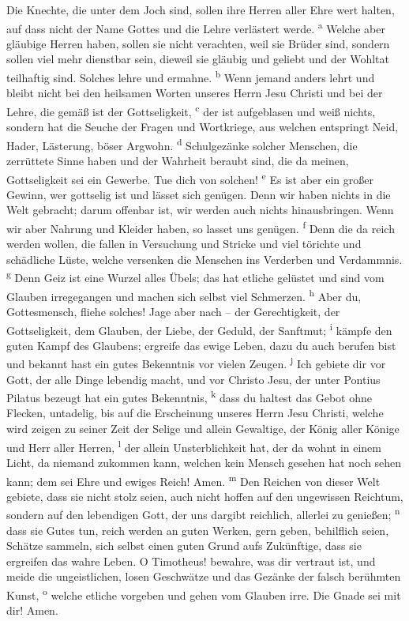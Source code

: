  Die Knechte, die unter dem Joch sind, sollen ihre Herren
aller Ehre wert halten, auf dass nicht der Name Gottes und die Lehre
verlästert werde. \textsuperscript{a}  Welche aber
gläubige Herren haben, sollen sie nicht verachten, weil sie Brüder sind,
sondern sollen viel mehr dienstbar sein, dieweil sie gläubig und geliebt
und der Wohltat teilhaftig sind. Solches lehre und ermahne.
\textsuperscript{b}  Wenn jemand anders lehrt und bleibt
nicht bei den heilsamen Worten unseres Herrn Jesu Christi und bei der
Lehre, die gemäß ist der Gottseligkeit, \textsuperscript{c}
 der ist aufgeblasen und weiß nichts, sondern hat die
Seuche der Fragen und Wortkriege, aus welchen entspringt Neid, Hader,
Lästerung, böser Argwohn. \textsuperscript{d} 
Schulgezänke solcher Menschen, die zerrüttete Sinne haben und der
Wahrheit beraubt sind, die da meinen, Gottseligkeit sei ein Gewerbe. Tue
dich von solchen! \textsuperscript{e}  Es ist aber ein
großer Gewinn, wer gottselig ist und lässet sich genügen. 
Denn wir haben nichts in die Welt gebracht; darum offenbar ist, wir
werden auch nichts hinausbringen.  Wenn wir aber Nahrung
und Kleider haben, so lasset uns genügen. \textsuperscript{f}
 Denn die da reich werden wollen, die fallen in Versuchung
und Stricke und viel törichte und schädliche Lüste, welche versenken die
Menschen ins Verderben und Verdammnis. \textsuperscript{g}
 Denn Geiz ist eine Wurzel alles Übels; das hat etliche
gelüstet und sind vom Glauben irregegangen und machen sich selbst viel
Schmerzen. \textsuperscript{h}  Aber du, Gottesmensch,
fliehe solches! Jage aber nach -- der Gerechtigkeit, der Gottseligkeit,
dem Glauben, der Liebe, der Geduld, der Sanftmut; \textsuperscript{i}
 kämpfe den guten Kampf des Glaubens; ergreife das ewige
Leben, dazu du auch berufen bist und bekannt hast ein gutes Bekenntnis
vor vielen Zeugen. \textsuperscript{j}  Ich gebiete dir
vor Gott, der alle Dinge lebendig macht, und vor Christo Jesu, der unter
Pontius Pilatus bezeugt hat ein gutes Bekenntnis, \textsuperscript{k}
 dass du haltest das Gebot ohne Flecken, untadelig, bis
auf die Erscheinung unseres Herrn Jesu Christi,  welche
wird zeigen zu seiner Zeit der Selige und allein Gewaltige, der König
aller Könige und Herr aller Herren, \textsuperscript{l} 
der allein Unsterblichkeit hat, der da wohnt in einem Licht, da niemand
zukommen kann, welchen kein Mensch gesehen hat noch sehen kann; dem sei
Ehre und ewiges Reich! Amen. \textsuperscript{m}  Den
Reichen von dieser Welt gebiete, dass sie nicht stolz seien, auch nicht
hoffen auf den ungewissen Reichtum, sondern auf den lebendigen Gott, der
uns dargibt reichlich, allerlei zu genießen; \textsuperscript{n}
 dass sie Gutes tun, reich werden an guten Werken, gern
geben, behilflich seien,  Schätze sammeln, sich selbst
einen guten Grund aufs Zukünftige, dass sie ergreifen das wahre Leben.
 O Timotheus! bewahre, was dir vertraut ist, und meide
die ungeistlichen, losen Geschwätze und das Gezänke der falsch berühmten
Kunst, \textsuperscript{o}  welche etliche vorgeben und
gehen vom Glauben irre. Die Gnade sei mit dir! Amen.
